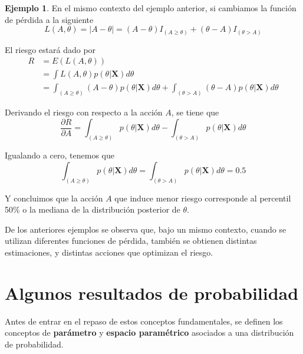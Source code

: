 \documentclass[
  10pt,
  spanish,
]{book}
\theoremstyle{definition}
\theoremstyle{definition}
\newtheorem{example}{Ejemplo}[chapter]
\theoremstyle{definition}
\theoremstyle{definition}
\theoremstyle{remark}
\begin{document}
\begin{example}
\protect\hypertarget{exm:unnamed-chunk-3}{}{\label{exm:unnamed-chunk-3} }En el mismo contexto del ejemplo anterior, si cambiamos la función de pérdida a la siguiente
\begin{equation*}
L(A,\theta)=|A-\theta|=(A-\theta)I_{(A\geq\theta)}+(\theta-A)I_{(\theta>A)}
\end{equation*}

El riesgo estará dado por
\begin{align*}
R&=E(L(A,\theta))\\
&=\int L(A,\theta)p(\theta|\mathbf{X})d\theta\\
&=\int_{(A\geq\theta)}(A-\theta)p(\theta|\mathbf{X})d\theta+\int_{(\theta>A)}(\theta-A)p(\theta|\mathbf{X})d\theta
\end{align*}

Derivando el riesgo con respecto a la acción \(A\), se tiene que
\begin{equation*}
\frac{\partial R}{\partial A}=\int_{(A\geq\theta)}p(\theta|\mathbf{X})d\theta-\int_{(\theta>A)}p(\theta|\mathbf{X})d\theta
\end{equation*}

Igualando a cero, tenemos que
\begin{equation*}
\int_{(A\geq\theta)}p(\theta|\mathbf{X})d\theta=\int_{(\theta>A)}p(\theta|\mathbf{X})d\theta=0.5
\end{equation*}

Y concluimos que la acción \(A\) que induce menor riesgo corresponde al percentil 50\% o la mediana de la distribución posterior de \(\theta\).
\end{example}

De los anteriores ejemplos se observa que, bajo un mismo contexto, cuando se utilizan diferentes funciones de pérdida, también se obtienen distintas estimaciones, y distintas acciones que optimizan el riesgo.

\hypertarget{algunos-resultados-de-probabilidad}{%
\section{Algunos resultados de probabilidad}\label{algunos-resultados-de-probabilidad}}

Antes de entrar en el repaso de estos conceptos fundamentales, se definen los conceptos de \textbf{parámetro} y \textbf{espacio paramétrico} asociados a una distribución de probabilidad.
\end{document}
